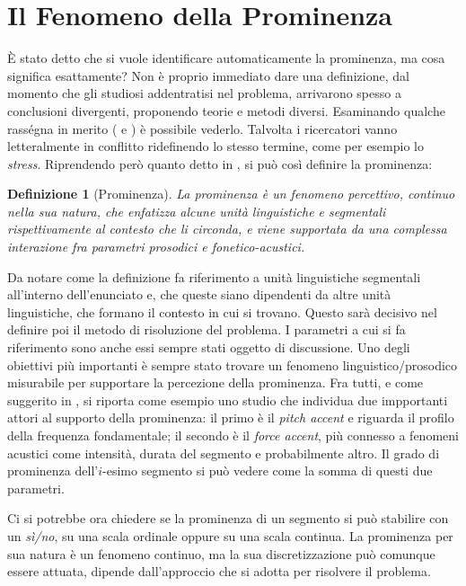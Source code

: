 \documentclass[twoside,twocolumn,10pt]{extarticle}
\theoremstyle{definition}
\begin{document}
\section{Il Fenomeno della Prominenza}\label{sec:prom}
	È stato detto che si vuole identificare automaticamente la prominenza, ma cosa significa esattamente? Non è proprio immediato dare una definizione, dal momento che gli studiosi addentratisi nel problema, arrivarono spesso a conclusioni divergenti, proponendo teorie e metodi diversi. Esaminando qualche rasségna in merito (\cite[Capitolo 1]{bib:fenomeni-prosodici-prominenza} e \cite{bib:prominence-by-acoustic-analyses}) è possibile vederlo. Talvolta i ricercatori vanno letteralmente in conflitto ridefinendo lo stesso termine, come per esempio lo \textit{stress}. Riprendendo però quanto detto in \cite{bib:prominence-by-acoustic-analyses}, si può così definire la prominenza:
	\theoremstyle{plain}
	\newtheorem{definition}{Definizione}
	\begin{definition}[Prominenza]\label{def:prosodic-prominency}
		La prominenza è un fenomeno percettivo, continuo nella sua natura, che enfatizza alcune unità linguistiche e segmentali rispettivamente al contesto che li circonda, e viene supportata da una complessa interazione fra parametri prosodici e fonetico-acustici.
	\end{definition}
	Da notare come la definizione fa riferimento a unità linguistiche segmentali all'interno dell'enunciato e, che queste siano dipendenti da altre unità linguistiche, che formano il contesto in cui si trovano. Questo sarà decisivo nel definire poi il metodo di risoluzione del problema. I parametri a cui si fa riferimento sono anche essi sempre stati oggetto di discussione. Uno degli obiettivi più importanti è sempre stato trovare un fenomeno linguistico/prosodico misurabile per supportare la percezione della prominenza. Fra tutti, e come suggerito in \cite{bib:prominence-by-acoustic-analyses}, si riporta come esempio uno studio che individua due impportanti attori al supporto della prominenza: il primo è il \textit{pitch accent} e riguarda il profilo della frequenza fondamentale; il secondo è il \textit{force accent}, più connesso a fenomeni acustici come intensità, durata del segmento e probabilmente altro. Il grado di prominenza dell'$i$-esimo segmento si può vedere come la somma di questi due parametri.

	Ci si potrebbe ora chiedere se la prominenza di un segmento si può stabilire con un \textit{sì/no}, su una scala ordinale oppure su una scala continua. La prominenza per sua natura è un fenomeno continuo, ma la sua discretizzazione può comunque essere attuata, dipende dall'approccio che si adotta per risolvere il problema.
	
\end{document}
